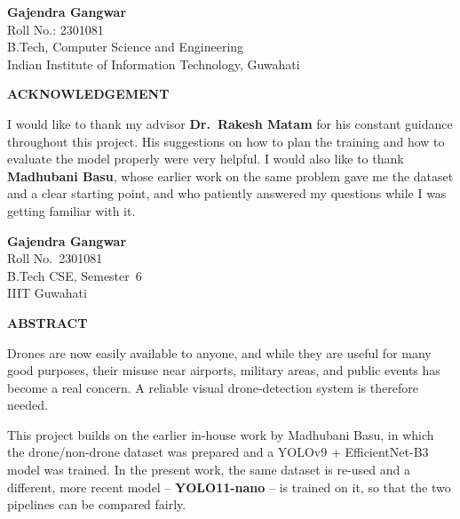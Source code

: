 \documentclass[12pt,a4paper]{report}
\begin{document}
\vspace{2cm}

\noindent
\begin{flushleft}
\textbf{Gajendra Gangwar}\\
Roll No.: 2301081\\
B.Tech, Computer Science and Engineering\\
Indian Institute of Information Technology, Guwahati
\end{flushleft}

\newpage

\thispagestyle{plain}
\begin{center}
{\Large\bfseries ACKNOWLEDGEMENT}
\end{center}
\vspace{0.8cm}

I would like to thank my advisor \textbf{Dr.~Rakesh Matam} for his constant
guidance throughout this project. His suggestions on how to plan the training
and how to evaluate the model properly were very helpful. I would also like to
thank \textbf{Madhubani Basu}, whose earlier work on the same problem
gave me the dataset and a clear starting point, and who patiently answered my
questions while I was getting familiar with it.

\vspace{1.5cm}
\noindent
\hfill \textbf{Gajendra Gangwar}\\
\hfill Roll No.\ 2301081\\
\hfill B.Tech CSE, Semester~6\\
\hfill IIIT Guwahati

\newpage

\thispagestyle{plain}
\begin{center}
{\Large\bfseries ABSTRACT}
\end{center}
\vspace{0.4cm}

Drones are now easily available to anyone, and while they are useful for many
good purposes, their misuse near airports, military areas, and public events has
become a real concern. A reliable visual drone-detection system is therefore
needed.

This project builds on the earlier in-house work by Madhubani Basu, in
which the drone/non-drone dataset was prepared and a YOLOv9 + EfficientNet-B3
model was trained. In the present work, the same dataset is re-used and a
different, more recent model -- \textbf{YOLO11-nano} -- is trained on it, so that
the two pipelines can be compared fairly.
\end{document}
